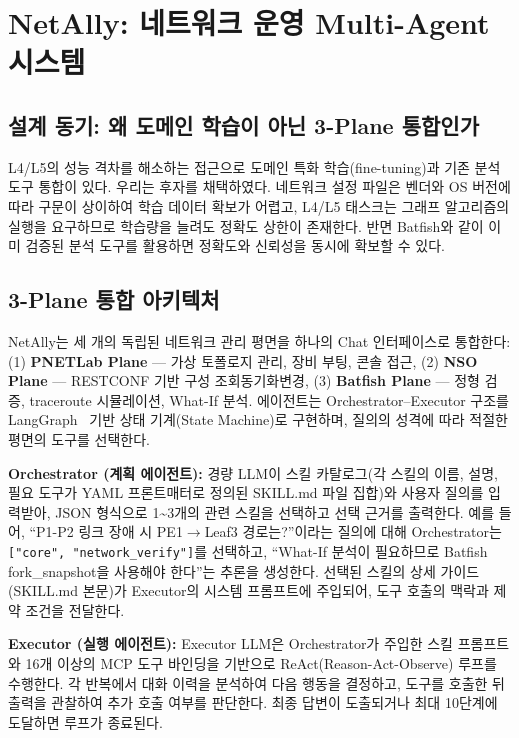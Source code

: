 
\section{NetAlly: 네트워크 운영 Multi-Agent 시스템}
\subsection{설계 동기: 왜 도메인 학습이 아닌 3-Plane 통합인가}
L4/L5의 성능 격차를 해소하는 접근으로 도메인 특화 학습(fine-tuning)과 기존 분석 도구 통합이 있다. 우리는 후자를 채택하였다. 네트워크 설정 파일은 벤더와 OS 버전에 따라 구문이 상이하여 학습 데이터 확보가 어렵고, L4/L5 태스크는 그래프 알고리즘의 실행을 요구하므로 학습량을 늘려도 정확도 상한이 존재한다. 반면 Batfish와 같이 이미 검증된 분석 도구를 활용하면 정확도와 신뢰성을 동시에 확보할 수 있다.

\subsection{3-Plane 통합 아키텍처}
NetAlly는 세 개의 독립된 네트워크 관리 평면을 하나의 Chat 인터페이스로 통합한다: (1) \textbf{PNETLab Plane} --- 가상 토폴로지 관리, 장비 부팅, 콘솔 접근, (2) \textbf{NSO Plane} --- RESTCONF 기반 구성 조회\textperiodcentered 동기화\textperiodcentered 변경, (3) \textbf{Batfish Plane} --- 정형 검증, traceroute 시뮬레이션, What-If 분석. 에이전트는 Orchestrator--Executor 구조를 LangGraph~\cite{ref3} 기반 상태 기계(State Machine)로 구현하며, 질의의 성격에 따라 적절한 평면의 도구를 선택한다.

\textbf{Orchestrator (계획 에이전트):} 경량 LLM이 스킬 카탈로그(각 스킬의 이름, 설명, 필요 도구가 YAML 프론트매터로 정의된 SKILL.md 파일 집합)와 사용자 질의를 입력받아, JSON 형식으로 1\textasciitilde3개의 관련 스킬을 선택하고 선택 근거를 출력한다. 예를 들어, ``P1-P2 링크 장애 시 PE1$\rightarrow$Leaf3 경로는?''이라는 질의에 대해 Orchestrator는 \texttt{["core", "network\_verify"]}를 선택하고, ``What-If 분석이 필요하므로 Batfish fork\_snapshot을 사용해야 한다''는 추론을 생성한다. 선택된 스킬의 상세 가이드(SKILL.md 본문)가 Executor의 시스템 프롬프트에 주입되어, 도구 호출의 맥락과 제약 조건을 전달한다.

\textbf{Executor (실행 에이전트):} Executor LLM은 Orchestrator가 주입한 스킬 프롬프트와 16개 이상의 MCP 도구 바인딩을 기반으로 ReAct(Reason-Act-Observe) 루프를 수행한다. 각 반복에서 대화 이력을 분석하여 다음 행동을 결정하고, 도구를 호출한 뒤 출력을 관찰하여 추가 호출 여부를 판단한다. 최종 답변이 도출되거나 최대 10단계에 도달하면 루프가 종료된다.


